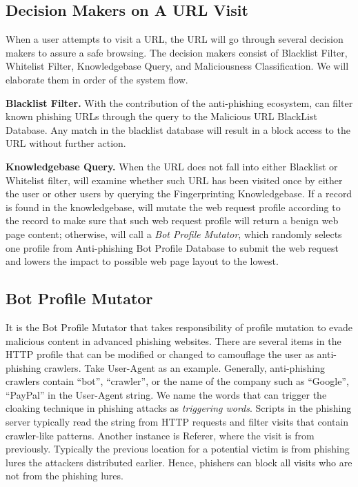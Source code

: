 \subsection{Decision Makers on A URL Visit}

When a user attempts to visit a URL, the URL will go through several decision makers to assure a safe browsing.
The decision makers consist of Blacklist Filter, Whitelist Filter, Knowledgebase Query, and Maliciousness Classification.
We will elaborate them in order of the system flow.

\noindent
\textbf{Blacklist Filter.}
With the contribution of the anti-phishing ecosystem, \spartacus can filter known phishing URLs through the query to the Malicious URL BlackList Database.
Any match in the blacklist database will result in a block access to the URL without further action.


\noindent
\textbf{Knowledgebase Query.}
When the URL does not fall into either Blacklist or Whitelist filter, \spartacus will examine whether such URL has been visited once by either the user or other users by querying the Fingerprinting Knowledgebase.
If a record is found in the knowledgebase, \spartacus will mutate the web request profile according to the record to make sure that such web request profile will return a benign web page content;
otherwise, \spartacus will call a \emph{Bot Profile Mutator}, which randomly selects one profile from Anti-phishing Bot Profile Database to submit the web request and lowers the impact to possible web page layout to the lowest.



\subsection{Bot Profile Mutator}

It is the Bot Profile Mutator that takes responsibility of profile mutation to evade malicious content in advanced phishing websites.
There are several items in the HTTP profile that can be modified or changed to camouflage the user as anti-phishing crawlers.
Take User-Agent as an example. 
Generally, anti-phishing crawlers contain ``bot'', ``crawler'', or the name of the company such as ``Google'', ``PayPal'' in the User-Agent string.
We name the words that can trigger the cloaking technique in phishing attacks as \emph{triggering words}.
Scripts in the phishing server typically read the string from HTTP requests and filter visits that contain crawler-like patterns.
Another instance is Referer, where the visit is from previously.
Typically the previous location for a potential victim is from phishing lures the attackers distributed earlier.
Hence, phishers can block all visits who are not from the phishing lures.

